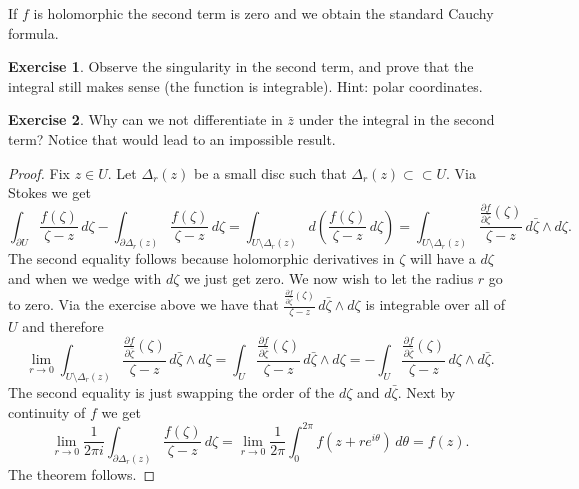\documentclass[12pt,openany]{book}
\newcommand{\R}{{\mathbb{R}}}
\theoremstyle{plain}
\theoremstyle{remark}
\theoremstyle{definition}
\newenvironment{exbox}{%
    \def\FrameCommand{\vrule width 1pt \relax\hspace {10pt}}%
    \MakeFramed {\advance \hsize -\width \FrameRestore }%
}{%
    \endMakeFramed
}
\theoremstyle{exercise}
\newtheorem{exercise}{Exercise}[section]
\theoremstyle{example}
\begin{document}
If $f$ is holomorphic the second term is zero and we
obtain the standard Cauchy formula.

\begin{exbox}
\begin{exercise}
Observe the singularity in the second term, and prove that the integral still makes
sense (the function is integrable).  Hint: polar coordinates.
\end{exercise}

\begin{exercise}
Why can we not differentiate in $\bar{z}$ under the integral in the second
term?  Notice that would lead to an impossible result.
\end{exercise}
\end{exbox}

\begin{proof}
Fix $z \in U$.  Let $\Delta_r(z)$ be a small disc such that
$\Delta_r(z) \subset
\subset U$.
Via Stokes we get
\begin{equation*}
\int_{\partial U} \frac{f(\zeta)}{\zeta-z}\,  d\zeta - 
\int_{\partial \Delta_r(z)} \frac{f(\zeta)}{\zeta-z}\,  d\zeta
=
\int_{U \setminus \Delta_r(z)} d\left( \frac{f(\zeta)}{\zeta-z} \, d\zeta \right)
=
\int_{U \setminus \Delta_r(z)} \frac{\frac{\partial f}{\partial
\bar{\zeta}}(\zeta)}{\zeta-z} \, d\bar{\zeta} \wedge d\zeta .
\end{equation*}
The second equality follows because holomorphic derivatives in $\zeta$
will have a $d\zeta$ and when we wedge with $d\zeta$ we just get zero.
We now wish to let the radius $r$ go to zero.
Via the exercise above we have that 
$\frac{\frac{\partial f}{\partial \bar{\zeta}}(\zeta)}{\zeta-z} \, d\bar{\zeta} \wedge d\zeta$
is integrable over all of $U$ and therefore
\begin{equation*}
\lim_{r \to 0}
\int_{U \setminus \Delta_r(z)} \frac{\frac{\partial f}{\partial
\bar{\zeta}}(\zeta)}{\zeta-z} \, d\bar{\zeta} \wedge d\zeta
=
\int_{U} \frac{\frac{\partial f}{\partial
\bar{\zeta}}(\zeta)}{\zeta-z} \, d\bar{\zeta} \wedge d\zeta
=
-
\int_{U} \frac{\frac{\partial f}{\partial
\bar{\zeta}}(\zeta)}{\zeta-z} \, d\zeta \wedge d\bar{\zeta} .
\end{equation*}
The second equality is just swapping the order of the $d\zeta$ and
$d\bar{\zeta}$.
Next by continuity of $f$ we get
\begin{equation*}
\lim_{r \to 0}
\frac{1}{2\pi i}
\int_{\partial \Delta_r(z)} \frac{f(\zeta)}{\zeta-z}\,  d\zeta
=
\lim_{r \to 0}
\frac{1}{2\pi}
\int_0^{2\pi} f(z + r e^{i\theta})\, d\theta
=
f(z) .
\end{equation*}
The theorem follows.
\end{proof}
\end{document}
